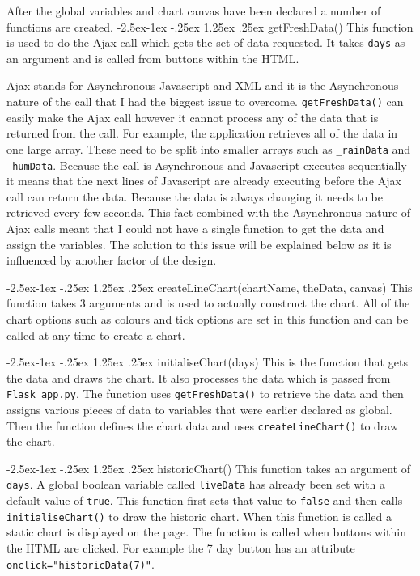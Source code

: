 \documentclass[10pt,a4paper]{article}
\makeatletter
\renewcommand\paragraph{\@startsection{paragraph}{4}{\z@}%
            {-2.5ex\@plus -1ex \@minus -.25ex}%
            {1.25ex \@plus .25ex}%
            {\normalfont\normalsize\bfseries}}
\makeatother
\begin{document}
After the global variables and chart canvas have been declared a number of functions are created. 
\paragraph{getFreshData()}
This function is used to do the Ajax call which gets the set of data requested. It takes \texttt{days} as an argument and is called from buttons within the HTML. 

Ajax stands for Asynchronous Javascript and XML and it is the Asynchronous nature of the call that I had the biggest issue to overcome. \texttt{getFreshData()} can easily make the Ajax call however it cannot process any of the data that is returned from the call. For example, the application retrieves all of the data in one large array. These need to be split into smaller arrays such as \texttt{\_rainData} and \texttt{\_humData}. Because the call is Asynchronous and Javascript executes sequentially it means that the next lines of Javascript are already executing before the Ajax call can return the data. Because the data is always changing it needs to be retrieved every few seconds. This fact combined with the Asynchronous nature of Ajax calls meant that I could not have a single function to get the data and assign the variables. The solution to this issue will be explained below as it is influenced by another factor of the design. 

\paragraph{createLineChart(chartName, theData, canvas)}
This function takes 3 arguments and is used to actually construct the chart. All of the chart options such as colours and tick options are set in this function and can be called at any time to create a chart. 

\paragraph{initialiseChart(days)}
This is the function that gets the data and draws the chart. It also processes the data which is passed from \texttt{Flask\_app.py}. The function uses \texttt{getFreshData()} to retrieve the data and then assigns various pieces of data to variables that were earlier declared as global. Then the function defines the chart data and uses \texttt{createLineChart()} to draw the chart. 

\paragraph{historicChart()}
This function takes an argument of \texttt{days}. A global boolean variable called \texttt{liveData} has already been set with a default value of \texttt{true}. This function first sets that value to \texttt{false} and then calls \texttt{initialiseChart()} to draw the historic chart. When this function is called a static chart is displayed on the page. The function is called when buttons within the HTML are clicked. For example the 7 day button has an attribute \texttt{onclick="historicData(7)"}. 
\end{document}
